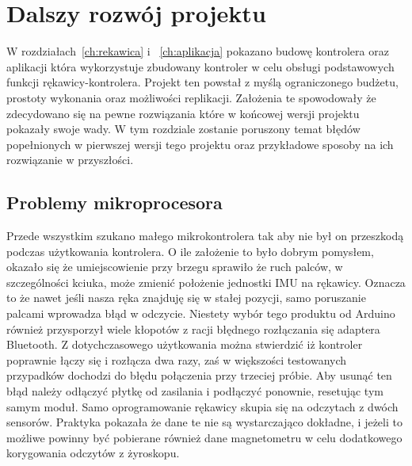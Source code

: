 \chapter{Dalszy rozwój projektu}
\label{ch:rozwoj}
 W rozdziałach~\ref{ch:rekawica} i ~\ref{ch:aplikacja} pokazano budowę kontrolera oraz aplikacji która wykorzystuje zbudowany kontroler w celu obsługi podstawowych funkcji rękawicy-kontrolera. Projekt ten powstał z myślą ograniczonego budżetu, prostoty wykonania oraz możliwości replikacji. Założenia te spowodowały że zdecydowano się na pewne rozwiązania które w końcowej wersji projektu pokazały swoje wady. W tym rozdziale zostanie poruszony temat błędów popełnionych w pierwszej wersji tego projektu oraz przykładowe sposoby na ich rozwiązanie w przyszłości. 
 
 \section{Problemy mikroprocesora}
 \label{sec:iuMikroprocesor}
 Przede wszystkim szukano małego mikrokontrolera tak aby nie był on przeszkodą podczas użytkowania kontrolera. O ile założenie to było dobrym pomysłem, okazało się że umiejscowienie przy brzegu sprawiło że ruch palców, w szczególności kciuka, może zmienić położenie jednostki IMU na rękawicy. Oznacza to że nawet jeśli nasza ręka znajduję się w stałej pozycji, samo poruszanie palcami wprowadza błąd w odczycie. Niestety wybór tego produktu od Arduino również przysporzył wiele kłopotów z racji błędnego rozłączania się adaptera Bluetooth. Z dotychczasowego użytkowania można stwierdzić iż kontroler poprawnie łączy się i rozłącza dwa razy, zaś w większości testowanych przypadków dochodzi do błędu połączenia przy trzeciej próbie. Aby usunąć ten błąd należy odłączyć płytkę od zasilania i podłączyć ponownie, resetując tym samym moduł. Samo oprogramowanie rękawicy skupia się na odczytach z dwóch sensorów. Praktyka pokazała że dane te nie są wystarczająco dokładne, i jeżeli to możliwe powinny być pobierane również dane magnetometru w celu dodatkowego korygowania odczytów z żyroskopu. 
 

